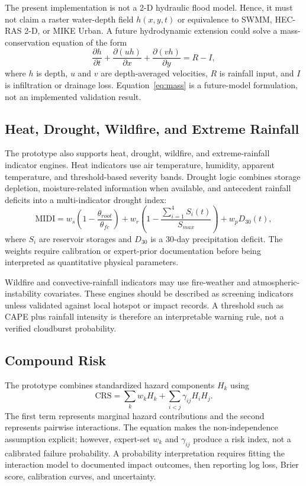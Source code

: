 \documentclass[journal]{IEEEtran}
\begin{document}
The present implementation is not a 2-D hydraulic flood model. Hence, it must not claim a raster water-depth field $h(x,y,t)$ or equivalence to SWMM, HEC-RAS 2-D, or MIKE Urban. A future hydrodynamic extension could solve a mass-conservation equation of the form
\begin{equation}
\frac{\partial h}{\partial t}+\frac{\partial (uh)}{\partial x}+\frac{\partial (vh)}{\partial y}=R-I,
\label{eq:mass}
\end{equation}
where $h$ is depth, $u$ and $v$ are depth-averaged velocities, $R$ is rainfall input, and $I$ is infiltration or drainage loss. Equation~\eqref{eq:mass} is a future-model formulation, not an implemented validation result.

\subsection{Heat, Drought, Wildfire, and Extreme Rainfall}
The prototype also supports heat, drought, wildfire, and extreme-rainfall indicator engines. Heat indicators use air temperature, humidity, apparent temperature, and threshold-based severity bands. Drought logic combines storage depletion, moisture-related information when available, and antecedent rainfall deficits into a multi-indicator drought index:
\begin{equation}
\mathrm{MIDI}=w_s\left(1-\frac{\theta_{root}}{\theta_{fc}}\right)+w_r\left(1-\frac{\sum_{i=1}^4 S_i(t)}{S_{max}}\right)+w_pD_{30}(t),
\label{eq:midi}
\end{equation}
where $S_i$ are reservoir storages and $D_{30}$ is a 30-day precipitation deficit. The weights require calibration or expert-prior documentation before being interpreted as quantitative physical parameters.

Wildfire and convective-rainfall indicators may use fire-weather and atmospheric-instability covariates. These engines should be described as screening indicators unless validated against local hotspot or impact records. A threshold such as CAPE plus rainfall intensity is therefore an interpretable warning rule, not a verified cloudburst probability.

\subsection{Compound Risk}
The prototype combines standardized hazard components $H_k$ using
\begin{equation}
\mathrm{CRS}=\sum_k w_kH_k+\sum_{i<j}\gamma_{ij}H_iH_j.
\label{eq:crs}
\end{equation}
The first term represents marginal hazard contributions and the second represents pairwise interactions. The equation makes the non-independence assumption explicit; however, expert-set $w_k$ and $\gamma_{ij}$ produce a risk index, not a calibrated failure probability. A probability interpretation requires fitting the interaction model to documented impact outcomes, then reporting log loss, Brier score, calibration curves, and uncertainty.
\end{document}
